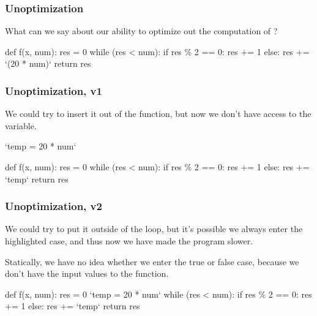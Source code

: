 \documentclass[aspectratio=169]{beamer}
\begin{document}
\begin{frame}[fragile]
  \frametitle{Unoptimization}

  What can we say about our ability to optimize out the computation of
  ?

  \vspace{\fill}

  \begin{pythoncodeblock}
    def f(x, num):
      res = 0
      while (res < num):
        if res \% 2 == 0:
          res += 1
        else:
          res += `(20 * num)`
      return res
  \end{pythoncodeblock}
\end{frame}

\begin{frame}[fragile]
  \frametitle{Unoptimization, v1}

  We could try to insert it out of the function, but now we don't have
  access to the  variable.

  \pause
  \vspace{\fill}

  \begin{pythoncodeblock}
    `temp = 20 * num`

    def f(x, num):
      res = 0
      while (res < num):
        if res \% 2 == 0:
          res += 1
        else:
          res += `temp`
      return res
  \end{pythoncodeblock}
\end{frame}

\begin{frame}[fragile]
  \frametitle{Unoptimization, v2}

  We could try to put it outside of the loop, but it's possible we always
  enter the highlighted  case, and thus now we have made the
  program slower.

  \pause
  \vspace{\fill}

  Statically, we have no idea whether we enter the true or false case,
  because we don't have the input values to the function.

  \pause
  \vspace{\fill}

  \begin{pythoncodeblock}
    def f(x, num):
      res = 0
      `temp = 20 * num`
      while (res < num):
        if res \% 2 == 0:
          res += 1
        else:
          res += `temp`
      return res
  \end{pythoncodeblock}
\end{frame}
\end{document}
